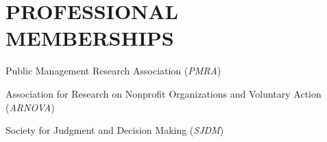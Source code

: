 \documentclass[letterpaper]{article}
\renewenvironment{itemize}{
  \begin{list}{}{
    \setlength{\leftmargin}{1.5em}
  }
}{
  \end{list}
}
\begin{document}
\bigskip

\section*{PROFESSIONAL MEMBERSHIPS}
\begin{itemize}
	
\item Public Management Research Association ({\it PMRA})
	
\item Association for Research on Nonprofit Organizations and Voluntary Action ({\it ARNOVA})

\item Society for Judgment and Decision Making ({\it SJDM})

\end{itemize}

\bigskip

\end{document}
